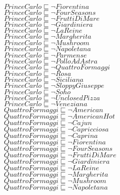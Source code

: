 \documentclass[a4paper,10pt]{article}
\begin{document}
 $PrinceCarlo \sqsubseteq  \lnot Fiorentina$\\ 
 $PrinceCarlo \sqsubseteq  \lnot FourSeasons$\\ 
 $PrinceCarlo \sqsubseteq  \lnot FruttiDiMare$\\ 
 $PrinceCarlo \sqsubseteq  \lnot Giardiniera$\\ 
 $PrinceCarlo \sqsubseteq  \lnot LaReine$\\ 
 $PrinceCarlo \sqsubseteq  \lnot Margherita$\\ 
 $PrinceCarlo \sqsubseteq  \lnot Mushroom$\\ 
 $PrinceCarlo \sqsubseteq  \lnot Napoletana$\\ 
 $PrinceCarlo \sqsubseteq  \lnot Parmense$\\ 
 $PrinceCarlo \sqsubseteq  \lnot PolloAdAstra$\\ 
 $PrinceCarlo \sqsubseteq  \lnot QuattroFormaggi$\\ 
 $PrinceCarlo \sqsubseteq  \lnot Rosa$\\ 
 $PrinceCarlo \sqsubseteq  \lnot Siciliana$\\ 
 $PrinceCarlo \sqsubseteq  \lnot SloppyGiuseppe$\\ 
 $PrinceCarlo \sqsubseteq  \lnot Soho$\\ 
 $PrinceCarlo \sqsubseteq  \lnot UnclosedPizza$\\ 
 $PrinceCarlo \sqsubseteq  \lnot Veneziana$\\ 
 $QuattroFormaggi \sqsubseteq  \lnot American$\\ 
 $QuattroFormaggi \sqsubseteq  \lnot AmericanHot$\\ 
 $QuattroFormaggi \sqsubseteq  \lnot Cajun$\\ 
 $QuattroFormaggi \sqsubseteq  \lnot Capricciosa$\\ 
 $QuattroFormaggi \sqsubseteq  \lnot Caprina$\\ 
 $QuattroFormaggi \sqsubseteq  \lnot Fiorentina$\\ 
 $QuattroFormaggi \sqsubseteq  \lnot FourSeasons$\\ 
 $QuattroFormaggi \sqsubseteq  \lnot FruttiDiMare$\\ 
 $QuattroFormaggi \sqsubseteq  \lnot Giardiniera$\\ 
 $QuattroFormaggi \sqsubseteq  \lnot LaReine$\\ 
 $QuattroFormaggi \sqsubseteq  \lnot Margherita$\\ 
 $QuattroFormaggi \sqsubseteq  \lnot Mushroom$\\ 
 $QuattroFormaggi \sqsubseteq  \lnot Napoletana$\\ 
\end{document}
